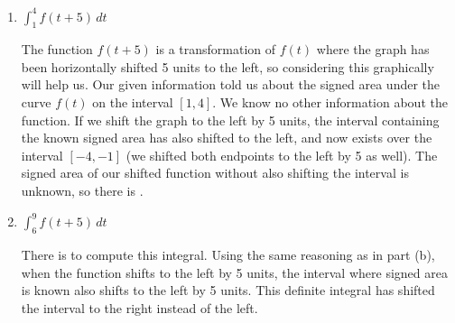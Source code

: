 \documentclass{article}
\begin{document}
\begin{enumerate}
\begin{enumerate}
\begin{solution}
        \end{solution}
        \item 
        \begin{problem}
        $\displaystyle\int_1^4 f(t+5)\,dt$
        \end{problem}
        \pspace{\vfill}

\begin{solution}
    The function $f(t+5)$ is a transformation of $f(t)$ where the graph has been horizontally shifted 5 units to the left, so considering this graphically will help us. Our given information told us about the signed area under the curve $f(t)$ on the interval $[1,4]$. We know no other information about the function. If we shift the graph to the left by 5 units, the interval containing the known signed area has also shifted to the left, and now exists over the interval $[-4, -1]$ (we shifted both endpoints to the left by 5 as well). The signed area of our shifted function without also shifting the interval is unknown, so there is . 
\end{solution}
        \item 
        \begin{problem}
        $\displaystyle\int_6^9 f(t+5)\,dt$
        \end{problem}
        \pspace{\vfill}

        \begin{solution}
            There is  to compute this integral. Using the same reasoning as in part (b), when the function shifts to the left by 5 units, the interval where signed area is known also shifts to the left by 5 units. This definite integral has shifted the interval to the right instead of the left. 
        \end{solution}

        \end{enumerate}
\pspace{\newpage}

    

\end{enumerate}
\end{document}
